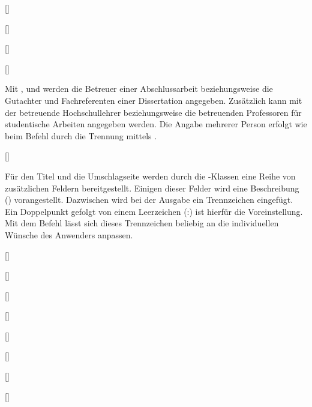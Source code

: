 \begin{DeclareEntity*}{}
\begin{DeclareEntity*}{}
\begin{DeclareEntity*}{}
\begin{Declaration}
  {[]}
\begin{Declaration}
  {[]}
\begin{Declaration}
  {[]}
\begin{Declaration}
  {[]}

Mit ,  und  werden die Betreuer 
einer Abschlussarbeit beziehungsweise die Gutachter und Fachreferenten einer 
Dissertation angegeben. Zusätzlich kann mit  der betreuende 
Hochschullehrer beziehungsweise die betreuenden Professoren für studentische 
Arbeiten angegeben werden. Die Angabe mehrerer Person erfolgt wie beim Befehl 
 durch die Trennung mittels .
\end{Declaration}
\end{Declaration}
\end{Declaration}
\end{Declaration}

\begin{Declaration}
  {[]}

Für den Titel und die Umschlagseite werden durch die \TUDScript-Klassen eine 
Reihe von zusätzlichen Feldern bereitgestellt. Einigen dieser Felder wird eine 
Beschreibung () vorangestellt. Dazwischen 
wird bei der Ausgabe ein Trennzeichen eingefügt. Ein Doppelpunkt gefolgt von 
einem Leerzeichen (:) ist hierfür die Voreinstellung. Mit 
dem Befehl  lässt sich dieses Trennzeichen beliebig an 
die individuellen Wünsche des Anwenders anpassen.
\end{Declaration}
%

\begin{Entity}{}
\begin{Declaration}
  {[]}
\begin{Declaration}
  {[]}
\begin{Declaration}
  {[]}
\begin{Declaration}
  {[]}
\begin{Declaration}
  {[]}
\begin{Declaration}
  {[]}
\begin{Declaration}
  {[]}
\begin{Declaration}
  {[]}
\printdeclarationlist


\end{Declaration}
\end{Declaration}
\end{Declaration}
\end{Declaration}
\end{Declaration}
\end{Declaration}
\end{Declaration}
\end{Declaration}
\end{Entity}
\end{DeclareEntity*}
\end{DeclareEntity*}
\end{DeclareEntity*}
